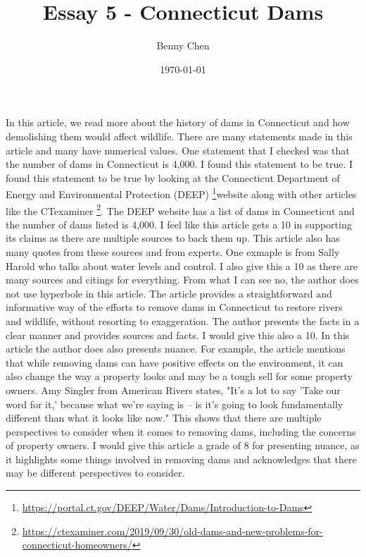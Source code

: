 \documentclass{article}
\title{Essay 5 - Connecticut Dams}
\author{Benny Chen}
\date{\today}
\begin{document}
\maketitle

In this article, we read more about the history of dams in Connecticut and how demolishing them would affect wildlife. There are many statements made in this article and many have numerical values. One statement that I checked was that the number of dams in Connecticut is 4,000. I found this statement to be true. I found this statement to be true by looking at the Connecticut Department of Energy and Environmental Protection (DEEP) \footnote[1]{\url{https://portal.ct.gov/DEEP/Water/Dams/Introduction-to-Dams}}website along with other articles like the CTexaminer \footnote[2]{\url{https://ctexaminer.com/2019/09/30/old-dams-and-new-problems-for-connecticut-homeowners/}}. The DEEP website has a list of dams in Connecticut and the number of dams listed is 4,000. I feel like this article gets a 10 in supporting its claims as there are multiple sources to back them up. This article also has many quotes from these sources and from experts. One exmaple is from Sally Harold who talks about water levels and control. I also give this a 10 as there are many sources and citings for everything. From what I can see no, the author does not use hyperbole in this article. The article provides a straightforward and informative way of the efforts to remove dams in Connecticut to restore rivers and wildlife, without resorting to exaggeration. The author presents the facts in a clear manner and provides sources and facts. I would give this also a 10. In this article the author does also presents nuance. For example, the article mentions that while removing dams can have positive effects on the environment, it can also change the way a property looks and may be a tough sell for some property owners. Amy Singler from American Rivers states, "It's a lot to say 'Take our word for it,' because what we're saying is -- is it's going to look fundamentally different than what it looks like now." This shows that there are multiple perspectives to consider when it comes to removing dams, including the concerns of property owners. I would give this article a grade of 8 for presenting nuance, as it highlights some things involved in removing dams and acknowledges that there may be different perspectives to consider.
\end{document}
